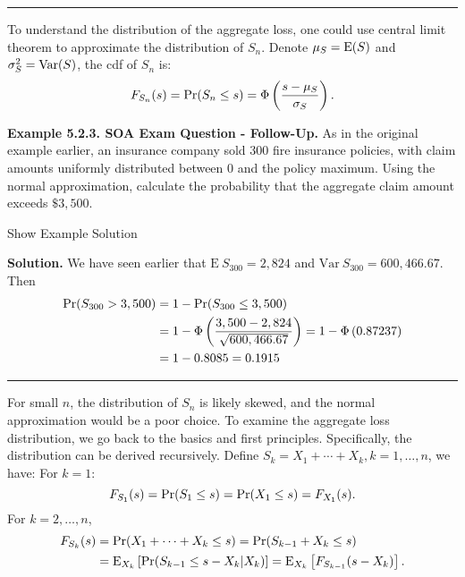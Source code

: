 \documentclass[]{book}
\theoremstyle{definition}
\theoremstyle{definition}
\theoremstyle{definition}
\theoremstyle{remark}
\begin{document}
\begin{center}\rule{0.5\linewidth}{\linethickness}\end{center}

To understand the distribution of the aggregate loss, one could use
central limit theorem to approximate the distribution of \(S_n\). Denote
\(\mu_S={\rm E}(S)\) and \(\sigma^2_S={\rm Var}(S)\), the cdf of \(S_n\)
is: \[\begin{aligned}
 F_{S_n}(s)={\rm Pr}({S_n}\leq s) = \Phi \left(\frac{s-\mu_S}{\sigma_S}\right).
\end{aligned}\]

\textbf{Example 5.2.3. SOA Exam Question - Follow-Up.} As in the
original example earlier, an insurance company sold 300 fire insurance
policies, with claim amounts uniformly distributed between 0 and the
policy maximum. Using the normal approximation, calculate the
probability that the aggregate claim amount exceeds \(\$3,500\).

Show Example Solution

\hypertarget{toggleExampleAggLoss.2.3}{}
\textbf{Solution.} We have seen earlier that
\(\mathrm{E~} S_{300}=2,824\) and \(\mathrm{Var~}S_{300} = 600,466.67\).
Then \[\begin{aligned}
{\rm Pr}(S_{300} > 3,500) &= 1 - {\rm Pr}(S_{300} \leq 3,500) \\
&= 1- \Phi \left( \frac{3,500-2,824}{\sqrt{600,466.67}} \right) = 1 - \Phi \left( 0.87237 \right) \\
&= 1 - 0.8085 = 0.1915
\end{aligned}\]

\begin{center}\rule{0.5\linewidth}{\linethickness}\end{center}

For small \(n\), the distribution of \(S_n\) is likely skewed, and the
normal approximation would be a poor choice. To examine the aggregate
loss distribution, we go back to the basics and first principles.
Specifically, the distribution can be derived recursively. Define
\(S_k=X_1 + \cdots + X_k, k=1,\ldots,n\), we have: For \(k=1\):
\[F_{S_1}(s) = {\rm Pr}(S_1\leq s) = {\rm Pr}(X_1\leq s) = F_{X_1}(s).\]
For \(k=2,\ldots,n\), \[\begin{aligned}
    F_{S_k}(s)&={\Pr}(X_1+\cdots+X_k\leq s) ={\Pr}(S_{k-1}+X_k\leq s) \\
    &={\rm E}_{X_k}\left[{\rm Pr}(S_{k-1}\leq s-X_k|X_k)\right]= {\rm E}_{X_k}\left[F_{S_{k-1}}(s-X_k)\right].
   \end{aligned}\]
\end{document}
